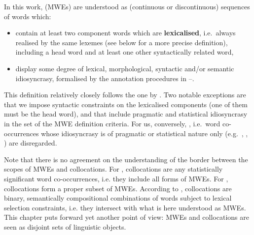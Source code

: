\documentclass[output=paper,modfonts]{langscibook}
\begin{document}
\noindent
In this work,  (MWEs) are understood as (continuous or discontinuous) sequences of words which: 
\begin{itemize}
\item contain at least two component words which are \textbf{lexicalised}, i.e.\ always realised by the same lexemes (see below for a more precise definition),
including a head word and at least one other syntactically related word, 
\item display some degree of {lexical}, morphological, syntactic and/or semantic idiosyncrasy, formalised by the annotation procedures in --.
\end{itemize}
This definition relatively closely follows the one by \citet{baldwin2010multiword}. Two notable exceptions are that we impose syntactic constraints on the lexicalised components (one of them must be the head word), and that \citet{baldwin2010multiword} include {pragmatic and} statistical idiosyncrasy in the set of the MWE definition criteria. For us, conversely, , i.e.\ word co-occurrences whose idiosyncrasy is of {pragmatic or} statistical nature only (e.g.\ , , ) are disregarded. %

Note that there is no agreement on the understanding of the border between the scopes of MWEs and collocations. For \citet{Sag2002a}, collocations are any statistically significant word co-occurrences, i.e. they include all forms of MWEs. For \citet{baldwin2010multiword}, collocations form a proper subset of MWEs. According to \citet{Melcuk10}, collocations are binary, semantically compositional combinations of words subject to lexical selection constraints, i.e. they intersect with what is here understood as MWEs. This chapter puts forward yet another point of view: MWEs and collocations are seen as disjoint sets of linguistic objects.
\end{document}
